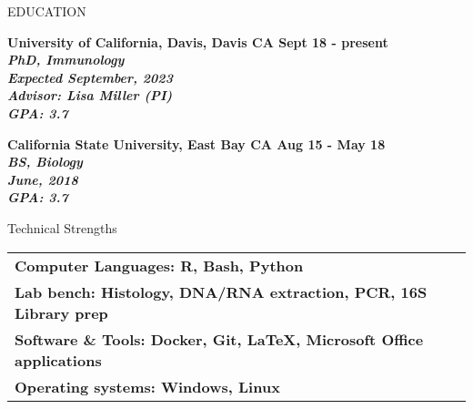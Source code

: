 \documentclass{resume} %
\begin{document}

\begin{rSection}{EDUCATION}

\bf University of California, Davis, Davis CA
\hfill Sept 18 - present\\
\sl PhD, Immunology \\
\textit{Expected} September, 2023\\
\textit{Advisor:} Lisa Miller (PI) \\
\hfill GPA: 3.7

\bf California State University, East Bay CA 
\hfill Aug 15 - May 18\\
\sl BS, Biology \\
\textit June, 2018 \\
\hfill GPA: 3.7

\end{rSection}


\begin{rSection}{Technical Strengths}

\begin{tabular}{ @{} >{\bfseries}l @{\hspace{6ex}}}
Computer Languages: R, Bash, Python \\
Lab bench: Histology, DNA/RNA extraction, PCR, 16S Library prep \\
Software \& Tools: Docker, Git, LaTeX, Microsoft Office applications \\
Operating systems: Windows, Linux
\end{tabular}

\end{rSection}

\end{document}
